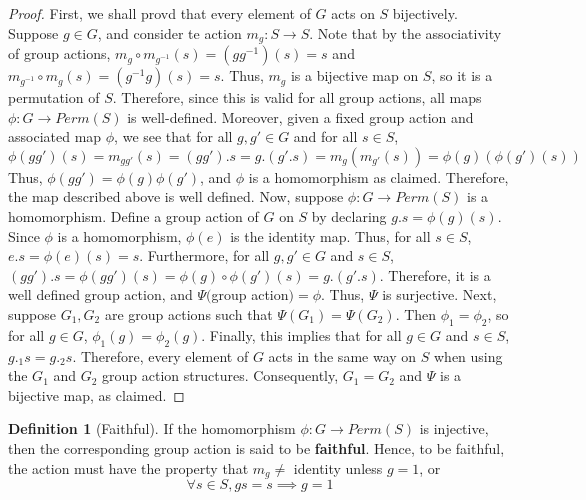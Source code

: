 \documentclass[12pt]{article}
\theoremstyle{definition}
\newtheorem{defn}[thm]{Definition}
\theoremstyle{remark}
\numberwithin{equation}{section}
\newcommand\B[1]{\textbf{ #1}}
\begin{document}
\begin{proof}
        First, we shall provd that every element of $G$ acts on $S$ bijectively. Suppose $g \in G$, and consider te action $m_g:S\rightarrow S$. Note that by the associativity of group actions, $m_g\circ m_{g^{-1}}(s) = (gg^{-1})(s) = s$ and $m_{g^{-1}}\circ m_g(s) = (g^{-1}g)(s) = s$. Thus, $m_g$ is a bijective map on $S$, so it is a permutation of $S$. Therefore, since this is valid for all group actions, all maps $\phi:G\rightarrow Perm(S)$ is well-defined. Moreover, given a fixed group action and associated map $\phi$, we see that for all $g,g' \in G$ and for all $s \in S$, $$\phi(gg')(s) = m_{gg'}(s) = (gg').s = g.(g'.s) = m_g(m_{g'}(s)) = \phi(g)(\phi(g')(s))$$ Thus, $\phi(gg') = \phi(g)\phi(g')$, and $\phi$ is a homomorphism as claimed. Therefore, the map described above is well defined. Now, suppose $\phi:G\rightarrow Perm(S)$ is a homomorphism. Define a group action of $G$ on $S$ by declaring $g.s =\phi(g)(s)$. Since $\phi$ is a homomorphism, $\phi(e)$ is the identity map. Thus, for all $s \in S$, $e.s = \phi(e)(s) = s$. Furthermore, for all $g,g' \in G$ and $s \in S$, $(gg').s = \phi(gg')(s) = \phi(g)\circ \phi(g')(s) = g.(g'.s)$. Therefore, it is a well defined group action, and $\Psi($group action$)=\phi$. Thus, $\Psi$ is surjective. Next, suppose $G_1,G_2$ are group actions such that $\Psi(G_1) = \Psi(G_2)$. Then $\phi_1 = \phi_2$, so for all $g \in G$, $\phi_1(g) = \phi_2(g)$. Finally, this implies that for all $g \in G$ and $s \in S$, $g._1s = g._2s$. Therefore, every element of $G$ acts in the same way on $S$ when using the $G_1$ and $G_2$ group action structures. Consequently, $G_1 = G_2$ and $\Psi$ is a bijective map, as claimed.
\end{proof}


\vspace{15pt}



\begin{defn}[Faithful]
        If the homomorphism $\phi:G\rightarrow Perm(S)$ is injective, then the corresponding group action is said to be \B{faithful}. Hence, to be faithful, the action must have the property that $m_g \neq $ identity unless $g=1$, or \begin{equation}
                \forall s \in S, gs = s \implies g=1
        \end{equation}
\end{defn}



\vspace{15pt}
\end{document}
